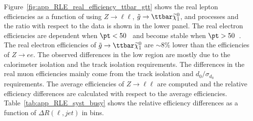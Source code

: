 Figure~\ref{fig:app_RLE_real_efficiency_ttbar_gtt} shows the real lepton efficiencies as a function of \pt using $Z\to \ell\ell$, $\tilde{g} \to \ttbar \widetilde{\chi}^{0}_{1}$, and \ttbar processes and the ratio with respect to the data is shown in the lower panel.
The real electron efficiencies are \pt dependent when $\pt < 50$~{\GeV} and become stable when $ \pt > 50$~{\GeV}.
The real electron efficiencies of $\tilde{g} \to \ttbar \widetilde{\chi}^{0}_{1}$ are $\sim$8\% lower than the efficiencies of $Z \to ee$.
The observed differences in the low \pt region are mostly due to the calorimeter isolation and the track isolation requirements.
The differences in the real muon efficiencies mainly come from the track isolation and $d_{0}/\sigma_{d_{0}}$ requirements.
The average efficiencies of $Z \to \ell \ell$ are computed and the relative efficiency differences are calculated  with respect to the average efficiencies.
Table~\ref{tab:app_RLE_syst_busy} shows the relative efficiency differences as a function of $\Delta R(\ell, jet)$ in  \pt bins.


